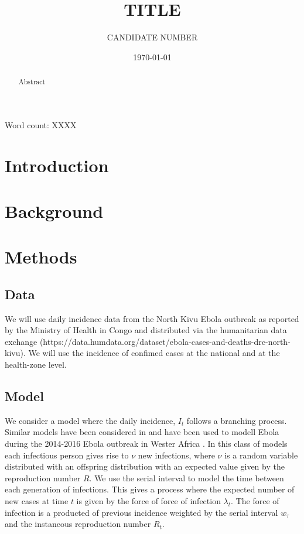 \documentclass[12pt]{article}
\title{TITLE}
\author{
  CANDIDATE NUMBER
}
\date{\today}
\begin{document}
\maketitle


Word count: XXXX

\begin{abstract}
  Abstract

\end{abstract}

\newpage

\tableofcontents

\section{Introduction}



\section{Background}

\section{Methods}

\subsection{Data}
We will use daily incidence data from the North Kivu Ebola outbreak as reported by the Ministry of Health in Congo and distributed via the humanitarian data exchange (https://data.humdata.org/dataset/ebola-cases-and-deaths-drc-north-kivu). We will use the incidence of confimed cases at the national and at the health-zone level.

\subsection{Model}

We consider a model where the daily incidence, $I_t$ follows a branching process. Similar models have been considered in \cite{coriNewFrameworkSoftware2013,lloyd-smithSuperspreadingEffectIndividual2005} and have been used to modell Ebola during the 2014-2016 Ebola outbreak in Wester Africa \cite{EbolaVirusDisease2014, internationalebolaresponseteamExposurePatternsDriving2016}. In this class of models each infectious person gives rise to $\nu$ new infections, where $\nu$ is a random variable distributed with an offspring distribution with an expected value given by the reproduction number $R$. We use the serial interval to model the time between each generation of infections. This gives a process where the expected number of new cases at time $t$ is given by the force of force of infection $\lambda_t$. The force of infection is a producted of previous incidence weighted by the serial interval $w_\tau$ and the instaneous reproduction number $R_t$. 
\end{document}
